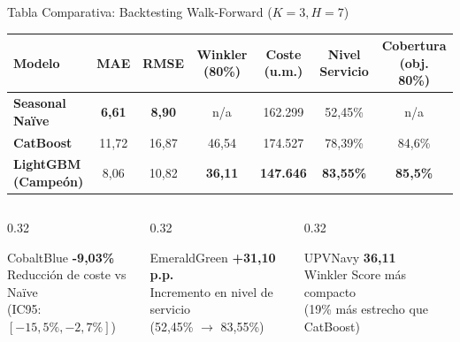 \documentclass[aspectratio=169, 10pt]{beamer}
\begin{document}
\begin{frame}{Tabla Comparativa: Backtesting Walk-Forward ($K=3, H=7$)}
  \begin{table}[h]
    \centering
    \footnotesize
    \begin{tabular}{lcccccc}
      \toprule
      \textbf{Modelo} & \textbf{MAE} & \textbf{RMSE} & \textbf{Winkler (80\%)} & \textbf{Coste (u.m.)} & \textbf{Nivel Servicio} & \textbf{Cobertura (obj. 80\%)} \\
      \midrule
      \textbf{Seasonal Naïve} & \textbf{6,61} & \textbf{8,90} & n/a & 162.299 & 52,45\% & n/a \\
      \textbf{CatBoost} & 11,72 & 16,87 & 46,54 & 174.527 & 78,39\% & 84,6\% \\
      \textbf{LightGBM (Campeón)} & 8,06 & 10,82 & \textbf{36,11} & \textbf{147.646} & \textbf{83,55\%} & \textbf{85,5\%} \\
      \bottomrule
    \end{tabular}
  \end{table}

  \begin{columns}[T]
    \begin{column}{0.32\textwidth}
      \begin{metriccard}{CobaltBlue}
        \centering
        \textbf{\large -9,03\%}\\[0.1cm]
        \scriptsize Reducción de coste vs Naïve\\(IC95: $[-15{,}5\%, -2{,}7\%]$)
      \end{metriccard}
    \end{column}
    \begin{column}{0.32\textwidth}
      \begin{metriccard}{EmeraldGreen}
        \centering
        \textbf{\large +31,10 p.p.}\\[0.1cm]
        \scriptsize Incremento en nivel de servicio\\(52,45\% $\rightarrow$ 83,55\%)
      \end{metriccard}
    \end{column}
    \begin{column}{0.32\textwidth}
      \begin{metriccard}{UPVNavy}
        \centering
        \textbf{\large 36,11}\\[0.1cm]
        \scriptsize Winkler Score más compacto\\(19\% más estrecho que CatBoost)
      \end{metriccard}
    \end{column}
  \end{columns}
\end{frame}
\end{document}
